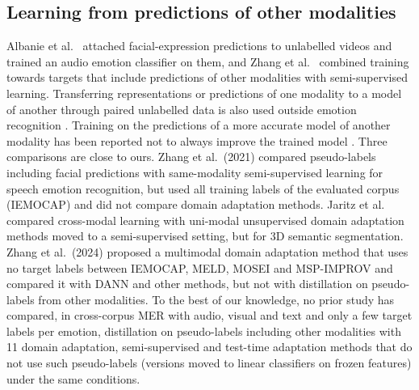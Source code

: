\subsection{Learning from predictions of other modalities}\label{sec:rel-distill}
Albanie et al.\ \cite{albanie2018} attached facial-expression predictions to unlabelled videos and trained an audio emotion classifier on them, and Zhang et al.\ \cite{zhang2021combining} combined training towards targets that include predictions of other modalities with semi-supervised learning. Transferring representations or predictions of one modality to a model of another through paired unlabelled data is also used outside emotion recognition \cite{gupta2016,jaritz2020xmuda}. Training on the predictions of a more accurate model of another modality has been reported not to always improve the trained model \cite{xue2023mfh}. Three comparisons are close to ours. Zhang et al.\ (2021) compared pseudo-labels including facial predictions with same-modality semi-supervised learning for speech emotion recognition, but used all training labels of the evaluated corpus (IEMOCAP) and did not compare domain adaptation methods. Jaritz et al.\ \cite{jaritz2023xmossda} compared cross-modal learning with uni-modal unsupervised domain adaptation methods moved to a semi-supervised setting, but for 3D semantic segmentation. Zhang et al.\ (2024) \cite{zhang2024amanda} proposed a multimodal domain adaptation method that uses no target labels between IEMOCAP, MELD, MOSEI and MSP-IMPROV and compared it with DANN and other methods, but not with distillation on pseudo-labels from other modalities. To the best of our knowledge, no prior study has compared, in cross-corpus MER with audio, visual and text and only a few target labels per emotion, distillation on pseudo-labels including other modalities with 11 domain adaptation, semi-supervised and test-time adaptation methods that do not use such pseudo-labels (versions moved to linear classifiers on frozen features) under the same conditions.

